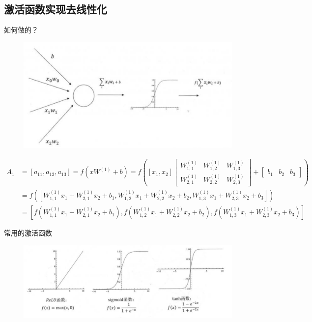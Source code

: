 \documentclass{article}\usepackage{listings} \usepackage{braket} \usepackage{amsmath,amssymb} \usepackage{geometry} \usepackage{graphicx} \usepackage{fancyvrb}\usepackage{braket} \usepackage{bm}\usepackage{hyperref} \usepackage{CJKutf8} \geometry{left=0.2cm,right=0.2cm,top=0.2cm,bottom=0.2cm} \renewcommand{\theequation}{\arabic{section}.\arabic{equation}} \renewcommand{\baselinestretch}{1.5}
\begin{document}
\begin{CJK}{UTF8}{gbsn}
\subsection{激活函数实现去线性化}
\label{sec:org420e81a}

如何做的？

\begin{figure}[htbp]
  \centering \includegraphics[width=0.6\linewidth]{nonlinear.png}
\end{figure}

\begin{displaymath}
  \begin{aligned} A_{1} &=\left[a_{11}, a_{12}, a_{13}\right]=f\left(x W^{(1)}+b\right)=f\left(\left[x_{1}, x_{2}\right]\left[\begin{array}{ccc}{W_{1,1}^{(1)}} & {W_{1,2}^{(1)}} & {W_{1,3}^{(1)}} \\ {W_{2,1}^{(1)}} & {W_{2,2}^{(1)}} & {W_{2,3}^{(1)}}\end{array}\right]+\left[\begin{array}{lll}{b_{1}} & {b_{2}} & {b_{3}}\end{array}\right]\right) \\ &=f\left(\left[W_{1,1}^{(1)} x_{1}+W_{2,1}^{(1)} x_{2}+b_{1}, W_{1,2}^{(1)} x_{1}+W_{2,2}^{(1)} x_{2}+b_{2}, W_{1,3}^{(1)} x_{1}+W_{2,3}^{(1)} x_{2}+b_{3}\right]\right) \\ &=\left[f\left(W_{1,1}^{(1)} x_{1}+W_{2,1}^{(1)} x_{2}+b_{1}\right), f\left(W_{1,2}^{(1)} x_{1}+W_{2,2}^{(1)} x_{2}+b_{2}\right), f\left(W_{1,3}^{(1)} x_{1}+W_{2,3}^{(1)} x_{2}+b_{3}\right)\right] \end{aligned}
\end{displaymath}

常用的激活函数

\begin{figure}[htbp]
  \centering \includegraphics[width=0.8\linewidth]{act.png}
\end{figure}


\end{CJK}
\end{document}

